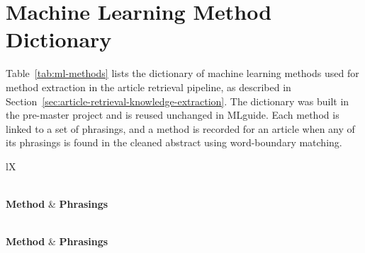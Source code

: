 \chapter{Machine Learning Method Dictionary}
\label{app:ml-methods}

Table~\ref{tab:ml-methods} lists the dictionary of machine learning
methods used for method extraction in the article retrieval
pipeline, as described in
Section~\ref{sec:article-retrieval-knowledge-extraction}. The
dictionary was built in the pre-master project
\parencite{bergsto2026mlselection} and is reused unchanged in
MLguide. Each method is linked to a set of phrasings, and a method
is recorded for an article when any of its phrasings is found in the
cleaned abstract using word-boundary matching.
 
\begin{xltabular}{\textwidth}{lX}
\caption[Machine learning method dictionary]{Machine learning
method dictionary used for method extraction, listing each method
and the phrasings matched against article abstracts.}
\label{tab:ml-methods} \\
\toprule
\textbf{Method} & \textbf{Phrasings} \\
\midrule
\endfirsthead
 
 \\
\toprule
\textbf{Method} & \textbf{Phrasings} \\
\midrule
\endhead
 
\midrule
{} \\
\endfoot
 
\bottomrule
\endlastfoot
 

\end{xltabular}
